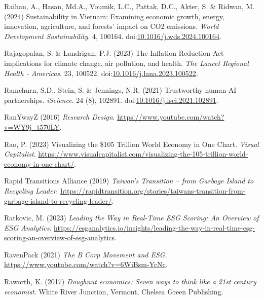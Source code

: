 \documentclass[
  letterpaper,
  DIV=11,
  numbers=noendperiod]{scrartcl}
\newlength{\cslhangindent}
\newenvironment{CSLReferences}[2] %
 {\begin{list}{}{%
  \setlength{\itemindent}{0pt}
  \setlength{\leftmargin}{0pt}
  \setlength{\parsep}{0pt}
  \ifodd #1
   \setlength{\leftmargin}{\cslhangindent}
   \setlength{\itemindent}{-1\cslhangindent}
  \fi
  \setlength{\itemsep}{#2\baselineskip}}}
 {\end{list}}
\begin{document}
\begin{CSLReferences}{0}{1}
Raihan, A., Hasan, Md.A., Voumik, L.C., Pattak, D.C., Akter, S. \&
Ridwan, M. (2024) Sustainability in {Vietnam}: {Examining} economic
growth, energy, innovation, agriculture, and forests' impact on {CO2}
emissions. \emph{World Development Sustainability}. 4, 100164.
doi:\href{https://doi.org/10.1016/j.wds.2024.100164}{10.1016/j.wds.2024.100164}.

Rajagopalan, S. \& Landrigan, P.J. (2023) The {Inflation Reduction Act}
-- implications for climate change, air pollution, and health. \emph{The
Lancet Regional Health - Americas}. 23, 100522.
doi:\href{https://doi.org/10.1016/j.lana.2023.100522}{10.1016/j.lana.2023.100522}.

Ramchurn, S.D., Stein, S. \& Jennings, N.R. (2021) Trustworthy
human-{AI} partnerships. \emph{iScience}. 24 (8), 102891.
doi:\href{https://doi.org/10.1016/j.isci.2021.102891}{10.1016/j.isci.2021.102891}.

RanYwayZ (2016) \emph{Research {Design}}.
\url{https://www.youtube.com/watch?v=WY9j_t570LY}.

Rao, P. (2023) Visualizing the \$105 {Trillion World Economy} in {One
Chart}. \emph{Visual Capitalist}.
\url{https://www.visualcapitalist.com/visualizing-the-105-trillion-world-economy-in-one-chart/}.

Rapid Transitions Alliance (2019) \emph{Taiwan's {Transition} -- from
{Garbage Island} to {Recycling Leader}}.
\url{https://rapidtransition.org/stories/taiwans-transition-from-garbage-island-to-recycling-leader/}.

Ratkovic, M. (2023) \emph{Leading the {Way} in {Real-Time ESG Scoring}:
{An Overview} of {ESG Analytics}}.
\url{https://esganalytics.io/insights/leading-the-way-in-real-time-esg-scoring-an-overview-of-esg-analytics}.

RavenPack (2021) \emph{The {B Corp Movement} and {ESG}}.
\url{https://www.youtube.com/watch?v=6WiBsm-YcNc}.

Raworth, K. (2017) \emph{Doughnut economics: Seven ways to think like a
21st century economist}. White River Junction, Vermont, Chelsea Green
Publishing.


\end{CSLReferences}
\end{document}
